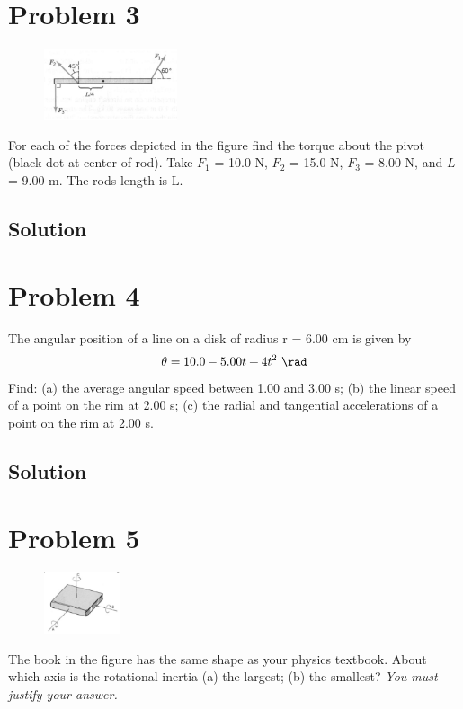 \documentclass[12pt]{article}
\begin{document}
\pagebreak
\section*{Problem 3}
\begin{figure}
    \vspace{-30pt}
    \includegraphics[width=0.35\textwidth]{graph_3.png} 
\end{figure}
For each of the forces depicted in the figure find the torque about the pivot (black dot at
center of rod). Take $F_1$ = 10.0 N, $F_2$ = 15.0 N, $F_3$ = 8.00 N, and $L$ = 9.00 m. The rods length
is L.

\subsection*{Solution}


\pagebreak
\section*{Problem 4}
The angular position of a line on a disk of radius r = 6.00 cm is given by
\[ \theta = 10.0 - 5.00 t + 4 t^2\ \unit{\rad} \]
Find: (a) the average angular speed between 1.00 and 3.00 s; (b) the linear speed of a point on
the rim at 2.00 s; (c) the radial and tangential accelerations of a point on the rim at 2.00 s.

\subsection*{Solution}


\pagebreak
\section*{Problem 5}
\begin{figure}
    \vspace{-30pt}
    \includegraphics[width=0.20\textwidth]{graph_5.png} 
\end{figure}
The book in the figure has the same shape as your physics textbook. About which axis is the
rotational inertia (a) the largest; (b) the smallest? \textit{You must justify your answer.}
\end{document}
